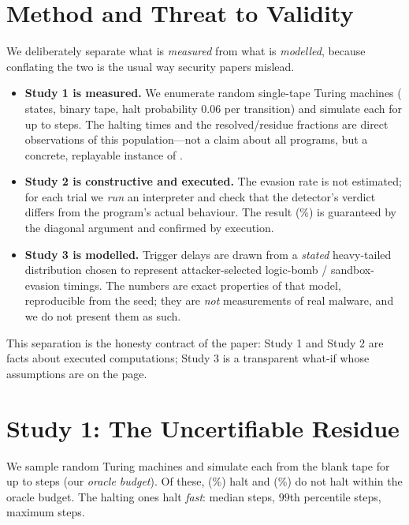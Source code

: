 \documentclass[11pt]{article}
\theoremstyle{plain}
\theoremstyle{definition}
\begin{document}
\section{Method and Threat to Validity}
\label{sec:method}
We deliberately separate what is \emph{measured} from what is \emph{modelled},
because conflating the two is the usual way security papers mislead.

\begin{itemize}[leftmargin=1.4em,itemsep=2pt]
  \item \textbf{Study 1 is measured.} We enumerate \expN{} random
  single-tape Turing machines (\expQ{} states, binary tape, halt probability
  $0.06$ per transition) and simulate each for up to \expBmax{} steps. The
  halting times and the resolved/residue fractions are direct observations of
  this population---not a claim about all programs, but a concrete, replayable
  instance of .
  \item \textbf{Study 2 is constructive and executed.} The evasion rate is not
  estimated; for each trial we \emph{run} an interpreter and check that the
  detector's verdict differs from the program's actual behaviour. The result
  (\expEvRate\%) is guaranteed by the diagonal argument and confirmed by
  execution.
  \item \textbf{Study 3 is modelled.} Trigger delays are drawn from a
  \emph{stated} heavy-tailed distribution chosen to represent attacker-selected
  logic-bomb / sandbox-evasion timings. The numbers are exact properties of
  that model, reproducible from the seed; they are \emph{not} measurements of
  real malware, and we do not present them as such.
\end{itemize}
This separation is the honesty contract of the paper: Study 1 and Study 2 are
facts about executed computations; Study 3 is a transparent what-if whose
assumptions are on the page.

\section{Study 1: The Uncertifiable Residue}
\label{sec:study1}
We sample \expN{} random Turing machines and simulate each from the blank tape
for up to \expBmax{} steps (our \emph{oracle budget}). Of these, \expNhalt{}
(\expHaltPct\%) halt and \expNnonhalt{} (\expNonhaltPct\%) do not halt within
the oracle budget. The halting ones halt \emph{fast}: median \expMedianHalt{}
steps, $99$th percentile \expHaltPtail{} steps, maximum \expMaxHalt{} steps.
\end{document}
